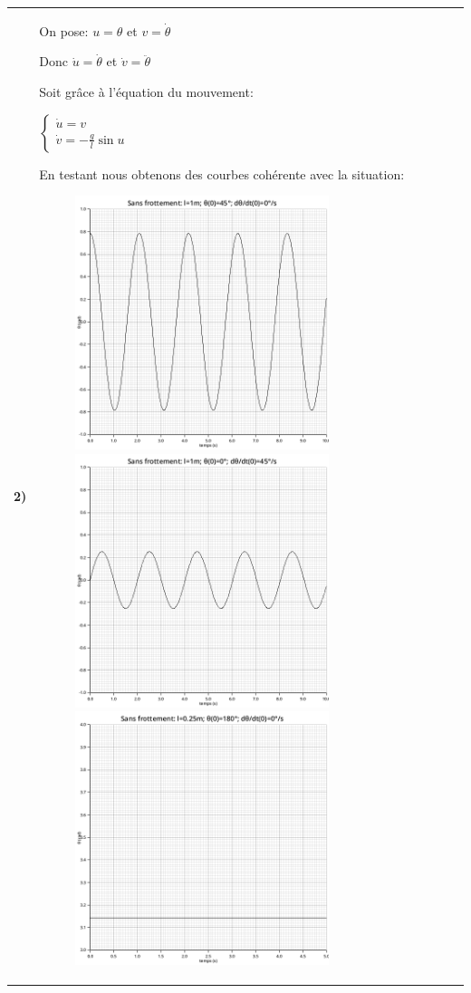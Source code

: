 \documentclass{article}
\newcommand{\question}[2]
{
    \begin{tabularx}{\linewidth}{lX}
        \textbf{#1)} & {#2}
    \end{tabularx} 
}
\begin{document}
{    \question{2}{
      On pose: $u=\theta$ et $v=\dot{\theta}$

      Donc $\dot{u}=\dot{\theta}$ et $\dot{v}=\ddot{\theta}$

      Soit grâce à l'équation du mouvement:

      $\boxed{\begin{cases}
        \dot{u}=v \\
        \dot{v}=-\frac{g}{l}\sin u
      \end{cases}}$

      En testant nous obtenons des courbes cohérente avec la situation:
      \begin{figure}[H]
        \centering
        \includegraphics[width=20em]{images/pendule_45.png}
        \includegraphics[width=20em]{images/pendule_0_vi.png}
        \includegraphics[width=20em]{images/pendule_180.png}

\end{figure}}}
\end{document}
